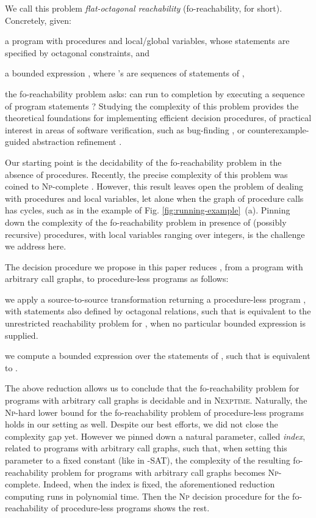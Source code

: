 \documentclass[final]{llncs}
\begin{document}
We call this problem \emph{flat-octagonal reachability}
(fo-reachability, for short). Concretely, given:
\begin{inparaenum}
\item a program  with procedures and local/global variables, 
      whose statements are specified by octagonal constraints, and
\item a bounded expression , where 's 
are sequences of statements of ,
\end{inparaenum}
the fo-reachability problem  asks:
can  run to completion by executing a sequence of program
statements  ?
Studying the complexity of this problem provides the theoretical
foundations for implementing efficient decision procedures, of
practical interest in areas of software verification, such as
bug-finding \cite{EsparzaG11}, or counterexample-guided abstraction
refinement \cite{KroeningLW13,HojjatIKKR12}.

Our starting point is the decidability of the fo-reachability problem
in the absence of procedures. Recently, the precise complexity of this
problem was coined to \textsc{Np}-complete \cite{bik14}. However, this
result leaves open the problem of dealing with procedures and local
variables, let alone when the graph of procedure calls has
cycles, such as in the example of
Fig. \ref{fig:running-example}~(a). Pinning down the complexity of the
fo-reachability problem in presence of (possibly recursive)
procedures, with local variables ranging over integers, is the
challenge we address here.

The decision procedure we propose in this paper reduces , from a program 
with arbitrary call graphs, to procedure-less programs as follows:
\begin{compactenum}
\item we apply a source-to-source transformation returning a procedure-less
      program , with statements also defined by
      octagonal relations, such that  is
      equivalent to the unrestricted reachability problem
      for , when no particular bounded expression is
      supplied.

\item we compute a bounded expression  over the statements
      of , such that  is
      equivalent to .
\end{compactenum}

The above reduction allows us to conclude that the fo-reachability
problem for programs with arbitrary call graphs is decidable and
in \textsc{Nexptime}. Naturally, the \textsc{Np}-hard lower
bound \cite{bik14} for the fo-reachability problem of procedure-less
programs holds in our setting as well.
Despite our best efforts, we did not close the complexity gap yet.
However we pinned down a natural parameter, called \emph{index},
related to programs with arbitrary call graphs, such that, when
setting this parameter to a fixed constant (like  in -SAT),
the complexity of the resulting fo-reachability problem for programs
with arbitrary call graphs becomes \textsc{Np}-complete. Indeed, when
the index is fixed, the aforementioned reduction computing
 runs in polynomial time. Then the
\textsc{Np} decision procedure for the fo-reachability of procedure-less
programs \cite{bik14} shows the rest.
\end{document}
